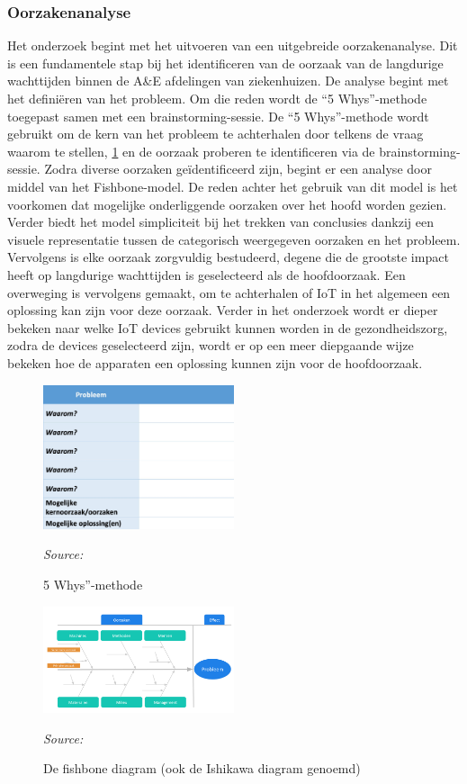 \subsubsection*{Oorzakenanalyse}
Het onderzoek begint met het uitvoeren van een uitgebreide oorzakenanalyse. Dit is een fundamentele stap bij het identificeren van de oorzaak van de langdurige wachttijden binnen de A\&E afdelingen van ziekenhuizen. De analyse begint met het definiëren van het probleem. Om die reden wordt de “5 Whys”-methode toegepast samen met een brain\-storming-sessie. De “5 Whys”-methode wordt gebruikt om de kern van het probleem te achterhalen door telkens de vraag waar\-om te stellen, \ref{fig:Figuur5} en de oorzaak proberen te identificeren via de brain\-storming-sessie. Zodra diverse oorzaken geïdentificeerd zijn, begint er een analyse door middel van het Fishbone-model. De reden achter het gebruik van dit model is het voorkomen dat mogelijke onderliggende oorzaken over het hoofd worden gezien. Verder biedt het model simpliciteit bij het trekken van conclusies dankzij een visuele representatie tussen de categorisch weergegeven oorzaken en het probleem. Vervolgens is elke oorzaak zorgvuldig bestudeerd, degene die de grootste impact heeft op langdurige wachttijden is geselecteerd als de hoofdoorzaak. Een overweging is vervolgens gemaakt, om te achterhalen of IoT in het algemeen een oplossing kan zijn voor deze oorzaak. Verder in het onderzoek wordt er dieper bekeken naar welke IoT devices gebruikt kunnen worden in de gezondheidszorg, zodra de devices geselecteerd zijn, wordt er op een meer diepgaande wijze bekeken hoe de apparaten een oplossing kunnen zijn voor de hoofdoorzaak.

\begin{figure}[h]
    \centering
    \includegraphics[width=0.5\textwidth]{img/Figuur-5}
    \caption{5 Whys”-methode}
    \label{fig:Figuur5}
    \textit{Source: \autocite{Scharwaechter2023}}
\end{figure}

\begin{figure}[h]
    \centering
    \includegraphics[width=0.5\textwidth]{img/Figuur-6}
    \caption{De fishbone diagram (ook de Ishikawa diagram genoemd)}
    \label{fig:Figuur6}
    \textit{Source: \autocite{Swaen2023}}
\end{figure}

